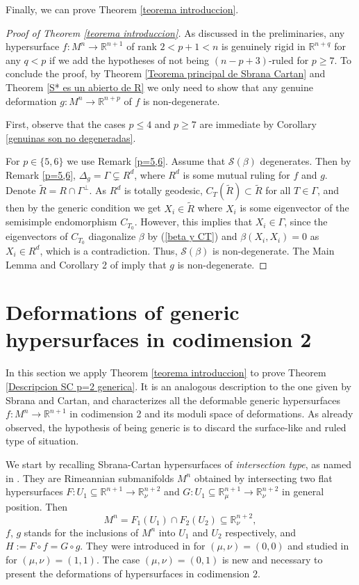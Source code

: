 \documentclass{article}
\theoremstyle{remark}
\begin{document}
Finally, we can prove Theorem \ref{teorema introduccion}.
\begin{proof}[Proof of Theorem \ref{teorema introduccion}]\label{prueba toerema intro}
    As discussed in the preliminaries, any hypersurface $f:M^n\rightarrow\mathbb{R}^{n+1}$ of rank $2<p+1<n$ is genuinely rigid in $\mathbb{R}^{n+q}$ for any $q<p$ if we add the hypotheses of not being $(n-p+3)$-ruled for $p\geq 7$. To conclude the proof, by Theorem \ref{Teorema principal de Sbrana Cartan} and Theorem \ref{S* es un abierto de R} we only need to show that any genuine deformation $g:M^n\rightarrow\mathbb{R}^{n+p}$ of $f$ is non-degenerate.

    First, observe that the cases $p\leq 4$ and $p\geq 7$ are immediate by Corollary \ref{genuinas son no degeneradas}.
    
    For $p\in\{5,6\}$ we use Remark \ref{p=5,6}. Assume that $\mathcal{S}(\beta)$ degenerates. Then by Remark \ref{p=5,6}, $\Delta_g=\Gamma\subsetneq R^d$, where $R^d$ is some mutual ruling for $f$ and $g$. Denote $\tilde{R}=R\cap\Gamma^\perp$. As $R^d$ is totally geodesic, $C_T(\tilde{R})\subset\tilde{R}$  for all $T\in\Gamma$, and then by the generic condition we get $X_i\in\tilde{R}$ where $X_i$ is some eigenvector of the semisimple endomorphism $C_{T_0}$. However, this implies that $X_i\in\Gamma$, since the eigenvectors of $C_{T_0}$ diagonalize $\beta$ by (\ref{beta y CT}) and $\beta(X_i,X_i)=0$ as $X_i\in R^d$, which is a contradiction. Thus, $\mathcal{S}(\beta)$ is non-degenerate. The Main Lemma and Corollary 2 of \cite{Moo} imply that $g$ is non-degenerate.
\end{proof}

\section{Deformations of generic hypersurfaces in codimension 2}\label{seccion deformaciones en codim 2}
In this section we apply Theorem \ref{teorema introduccion} to prove Theorem \ref{Descripcion SC p=2 generica}. It is an analogous description to the one given by Sbrana and Cartan, and characterizes all the deformable generic hypersurfaces $f:M^n\rightarrow\mathbb{R}^{n+1}$ in codimension 2 and its moduli space of deformations. As already observed, the hypothesis of being generic is to discard the surface-like and ruled type of situation. 

\text{ }

We start by recalling Sbrana-Cartan hypersurfaces of {\it intersection type}, as named in \cite{FF}. 
They are Rimeannian submanifolds $M^n$ obtained by intersecting two flat hypersurfaces $F:U_1\subseteq\mathbb{R}^{n+1}\rightarrow \mathbb{R}^{n+2}_\nu$ and $G:U_1\subseteq\mathbb{R}_{\mu}^{n+1}\rightarrow \mathbb{R}^{n+2}_\nu$ in general position. Then 
$$M^n=F_1(U_1)\cap F_2(U_2)\subseteq\mathbb{R}_{\nu}^{n+2},$$ 
$f$, $g$ stands for the inclusions of $M^n$ into $U_1$ and $U_2$ respectively, and $H:=F\circ f= G\circ g$. They were introduced in \cite{DFT2} for $(\mu,\nu)=(0,0)$ and studied in \cite{DF6} for $(\mu,\nu)=(1,1)$. The case $(\mu,\nu)=(0,1)$ is new and necessary to present the deformations of hypersurfaces in codimension $2$. 
\end{document}
